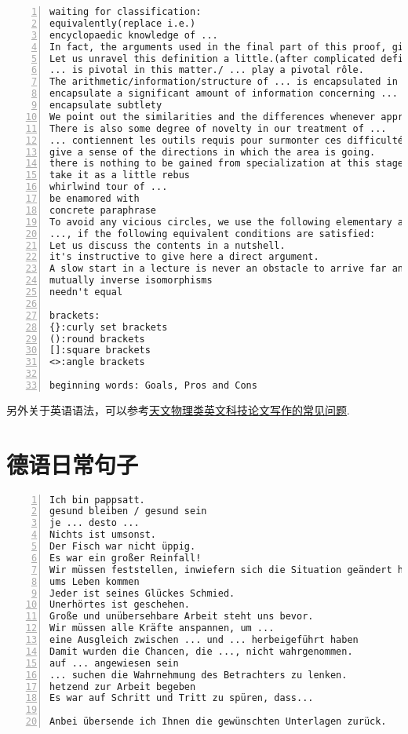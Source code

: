 \documentclass[11pt]{amsart}
\begin{document}
\begin{lstlisting}[numbers=left,numberstyle=\tiny,numbersep=10pt]
waiting for classification:
equivalently(replace i.e.)
encyclopaedic knowledge of ...
In fact, the arguments used in the final part of this proof, give the following result.
Let us unravel this definition a little.(after complicated definition)
... is pivotal in this matter./ ... play a pivotal rôle. 
The arithmetic/information/structure of ... is encapsulated in ...
encapsulate a significant amount of information concerning ...
encapsulate subtlety
We point out the similarities and the differences whenever appropriate.
There is also some degree of novelty in our treatment of ...
... contiennent les outils requis pour surmonter ces difficultés.
give a sense of the directions in which the area is going.
there is nothing to be gained from specialization at this stage
take it as a little rebus
whirlwind tour of ...
be enamored with
concrete paraphrase
To avoid any vicious circles, we use the following elementary argument going back to ...
..., if the following equivalent conditions are satisfied:
Let us discuss the contents in a nutshell.
it's instructive to give here a direct argument. 
A slow start in a lecture is never an obstacle to arrive far and present involved advanced material in the end.
mutually inverse isomorphisms
needn't equal

brackets:
{}:curly set brackets
():round brackets
[]:square brackets
<>:angle brackets

beginning words: Goals, Pros and Cons
\end{lstlisting}

另外关于英语语法，可以参考\href{https://arxiv.org/ftp/arxiv/papers/1011/1011.5973.pdf}{天文物理类英文科技论文写作的常见问题}.
\section{德语日常句子}
\begin{lstlisting}[numbers=left,numberstyle=\tiny,numbersep=10pt]
Ich bin pappsatt.
gesund bleiben / gesund sein
je ... desto ...
Nichts ist umsonst.
Der Fisch war nicht üppig.
Es war ein großer Reinfall!
Wir müssen feststellen, inwiefern sich die Situation geändert hat.
ums Leben kommen
Jeder ist seines Glückes Schmied.
Unerhörtes ist geschehen.
Große und unübersehbare Arbeit steht uns bevor.
Wir müssen alle Kräfte anspannen, um ...
eine Ausgleich zwischen ... und ... herbeigeführt haben
Damit wurden die Chancen, die ..., nicht wahrgenommen.
auf ... angewiesen sein
... suchen die Wahrnehmung des Betrachters zu lenken.
hetzend zur Arbeit begeben
Es war auf Schritt und Tritt zu spüren, dass...

Anbei übersende ich Ihnen die gewünschten Unterlagen zurück.
\end{lstlisting}
\end{document}
